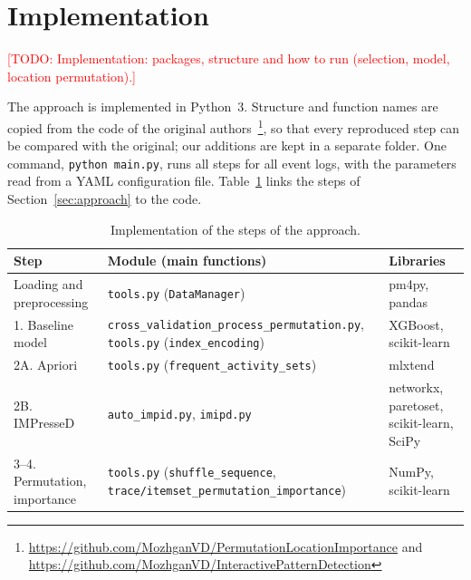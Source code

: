 \documentclass{article}
\newcommand{\todo}[1]{\textcolor{red}{[TODO: #1]}}
\begin{document}
\section{Implementation}

\todo{Implementation: packages, structure and how to run (selection, model, location permutation).}
\label{sec:implementation}

The approach is implemented in Python~3. Structure and function names are copied from the code of the original authors~\cite{vazifehdoostirani2024,vazifehdoostirani2023}\footnote{\url{https://github.com/MozhganVD/PermutationLocationImportance} and \url{https://github.com/MozhganVD/InteractivePatternDetection}}, so that every reproduced step can be compared with the original; our additions are kept in a separate folder. One command, \texttt{python main.py}, runs all steps for all event logs, with the parameters read from a YAML configuration file. Table~\ref{tab:implementation} links the steps of Section~\ref{sec:approach} to the code.

\begin{table}[H]
    \centering
    \caption{Implementation of the steps of the approach.}
    \label{tab:implementation}
    \small
    \begin{tabular}{@{}p{3.6cm}p{6.6cm}p{4.4cm}@{}}
        \toprule
        Step & Module (main functions) & Libraries \\
        \midrule
        Loading and preprocessing & \texttt{tools.py} (\texttt{DataManager}) & pm4py, pandas \\
        1. Baseline model & \texttt{cross\_validation\_process\_permutation.py}, \texttt{tools.py} (\texttt{index\_encoding}) & XGBoost, scikit-learn \\
        2A. Apriori & \texttt{tools.py} (\texttt{frequent\_activity\_sets}) & mlxtend \\
        2B. IMPresseD & \texttt{auto\_impid.py}, \texttt{imipd.py} & networkx, paretoset, scikit-learn, SciPy \\
        3--4. Permutation, importance & \texttt{tools.py} (\texttt{shuffle\_sequence}, \texttt{trace/itemset\_permutation\_importance}) & NumPy, scikit-learn \\
        \bottomrule
    \end{tabular}
\end{table}
\end{document}
